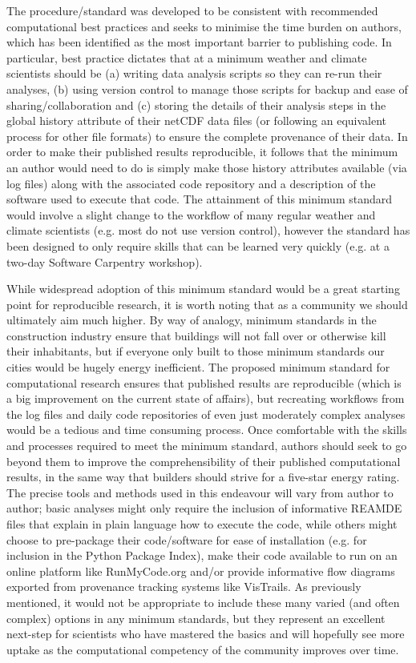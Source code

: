 The procedure/standard was developed to be consistent with recommended computational best practices and seeks to minimise the time burden on authors, which has been identified as the most important barrier to publishing code. In particular, best practice dictates that at a minimum weather and climate scientists should be (a) writing data analysis scripts so they can re-run their analyses, (b) using version control to manage those scripts for backup and ease of sharing/collaboration and (c) storing the details of their analysis steps in the global history attribute of their netCDF data files (or following an equivalent process for other file formats) to ensure the complete provenance of their data. In order to make their published results reproducible, it follows that the minimum an author would need to do is simply make those history attributes available (via log files) along with the associated code repository and a description of the software used to execute that code. The attainment of this minimum standard would involve a slight change to the workflow of many regular weather and climate scientists (e.g. most do not use version control), however the standard has been designed to only require skills that can be learned very quickly (e.g. at a two-day Software Carpentry workshop).  

While widespread adoption of this minimum standard would be a great starting point for reproducible research, it is worth noting that as a community we should ultimately aim much higher. By way of analogy, minimum standards in the construction industry ensure that buildings will not fall over or otherwise kill their inhabitants, but if everyone only built to those minimum standards our cities would be hugely energy inefficient. The proposed minimum standard for computational research ensures that published results are reproducible (which is a big improvement on the current state of affairs), but recreating workflows from the log files and daily code repositories of even just moderately complex analyses would be a tedious and time consuming process. Once comfortable with the skills and processes required to meet the minimum standard, authors should seek to go beyond them to improve the comprehensibility of their published computational results, in the same way that builders should strive for a five-star energy rating. The precise tools and methods used in this endeavour will vary from author to author; basic analyses might only require the inclusion of informative REAMDE files that explain in plain language how to execute the code, while others might choose to pre-package their code/software for ease of installation (e.g. for inclusion in the Python Package Index), make their code available to run on an online platform like RunMyCode.org and/or provide informative flow diagrams exported from provenance tracking systems like VisTrails. As previously mentioned, it would not be appropriate to include these many varied (and often complex) options in any minimum standards, but they represent an excellent next-step for scientists who have mastered the basics and will hopefully see more uptake as the computational competency of the community improves over time.

  







